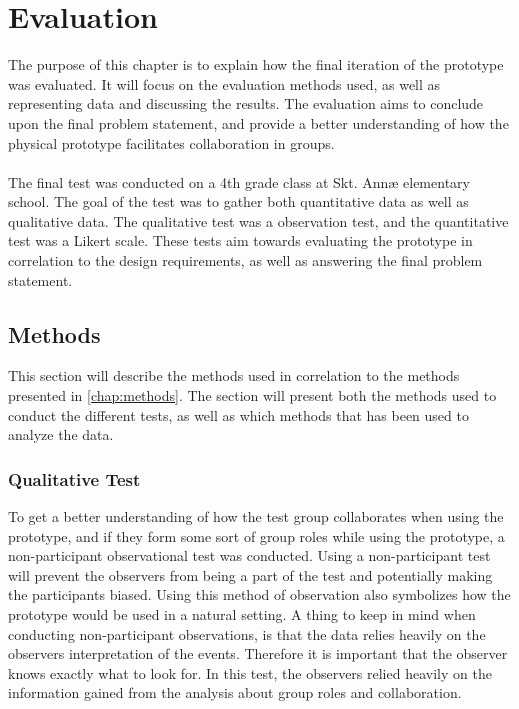 \chapter{Evaluation}

The purpose of this chapter is to explain how the final iteration of the prototype was evaluated. It will focus on the evaluation methods used, as well as representing data and discussing the results. The evaluation aims to conclude upon the final problem statement, and provide a better understanding of how the physical prototype facilitates collaboration in groups.\\\\

The final test was conducted on a 4th grade class at Skt. Annæ elementary school. The goal of the test was to gather both quantitative data as well as qualitative data. The qualitative test was a observation test, and the quantitative test was a Likert scale. These tests aim towards evaluating the prototype in correlation to the design requirements, as well as answering the final problem statement.

\section{Methods}
This section will describe the methods used in correlation to the methods presented in \autoref{chap:methods}. The section will present both the methods used to conduct the different tests, as well as which methods that has been used to analyze the data.

\subsection{Qualitative Test}
To get a better understanding of how the test group collaborates when using the prototype, and if they form some sort of group roles while using the prototype, a non-participant observational test was conducted\cite[p.~64-67]{bjoernerBog}. Using a non-participant test will prevent the observers from being a part of the test and potentially making the participants biased. Using this method of observation also symbolizes how the prototype would be used in a natural setting. A thing to keep in mind when conducting non-participant observations, is that the data relies heavily on the observers interpretation of the events. Therefore it is important that the observer knows exactly what to look for. In this test, the observers relied heavily on the information gained from the analysis about group roles and collaboration\cite[p.~64-67]{bjoernerBog}.\\\\


